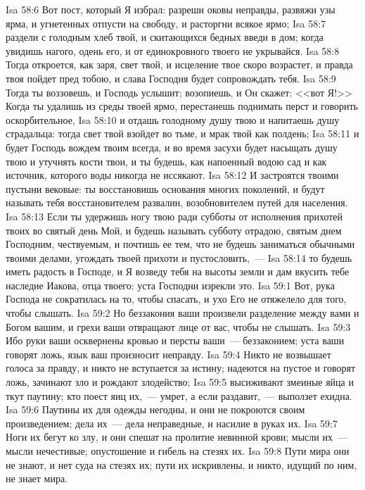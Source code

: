 \vs Isa 58:6 Вот пост, который Я избрал: разреши оковы неправды, развяжи узы ярма, и угнетенных отпусти на свободу, и расторгни всякое ярмо;
\vs Isa 58:7 раздели с голодным хлеб твой, и скитающихся бедных введи в дом; когда увидишь нагого, одень его, и от единокровного твоего не укрывайся.
\vs Isa 58:8 Тогда откроется, как заря, свет твой, и исцеление твое скоро возрастет, и правда твоя пойдет пред тобою, и слава Господня будет сопровождать тебя.
\vs Isa 58:9 Тогда ты воззовешь, и Господь услышит; возопиешь, и Он скажет: <<вот Я!>> Когда ты удалишь из среды твоей ярмо, перестанешь поднимать перст и говорить оскорбительное,
\vs Isa 58:10 и отдашь голодному душу твою и напитаешь душу страдальца: тогда свет твой взойдет во тьме, и мрак твой  как полдень;
\vs Isa 58:11 и будет Господь вождем твоим всегда, и во время засухи будет насыщать душу твою и утучнять кости твои, и ты будешь, как напоенный водою сад и как источник, которого воды никогда не иссякают.
\vs Isa 58:12 И застроятся  твоими пустыни вековые: ты восстановишь основания многих поколений, и будут называть тебя восстановителем развалин, возобновителем путей для населения.
\vs Isa 58:13 Если ты удержишь ногу твою ради субботы от исполнения прихотей твоих во святый день Мой, и будешь называть субботу отрадою, святым днем Господним, чествуемым, и почтишь ее тем, что не будешь заниматься обычными твоими делами, угождать твоей прихоти и пустословить,~---
\vs Isa 58:14 то будешь иметь радость в Господе, и Я возведу тебя на высоты земли и дам вкусить тебе наследие Иакова, отца твоего: уста Господни изрекли это.
\vs Isa 59:1 Вот, рука Господа не сократилась на то, чтобы спасать, и ухо Его не отяжелело для того, чтобы слышать.
\vs Isa 59:2 Но беззакония ваши произвели разделение между вами и Богом вашим, и грехи ваши отвращают лице  от вас, чтобы не слышать.
\vs Isa 59:3 Ибо руки ваши осквернены кровью и персты ваши~--- беззаконием; уста ваши говорят ложь, язык ваш произносит неправду.
\vs Isa 59:4 Никто не возвышает голоса за правду, и никто не вступается за истину; надеются на пустое и говорят ложь, зачинают зло и рождают злодейство;
\vs Isa 59:5 высиживают змеиные яйца и ткут паутину; кто поест яиц их,~--- умрет, а если раздавит,~--- выползет ехидна.
\vs Isa 59:6 Паутины их для одежды негодны, и они не покроются своим произведением; дела их~--- дела неправедные, и насилие в руках их.
\vs Isa 59:7 Ноги их бегут ко злу, и они спешат на пролитие невинной крови; мысли их~--- мысли нечестивые; опустошение и гибель на стезях их.
\vs Isa 59:8 Пути мира они не знают, и нет суда на стезях их; пути их искривлены, и никто, идущий по ним, не знает мира.
